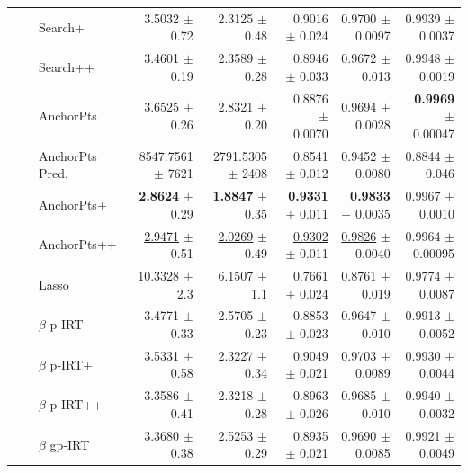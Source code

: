 \begin{longtable}{llp{}rrrrr}
 &  & Search+ & 3.5032 {\scriptsize $\pm$ 0.72} & 2.3125 {\scriptsize $\pm$ 0.48} & 0.9016 {\scriptsize $\pm$ 0.024} & 0.9700 {\scriptsize $\pm$ 0.0097} & 0.9939 {\scriptsize $\pm$ 0.0037} \\
 &  & Search++ & 3.4601 {\scriptsize $\pm$ 0.19} & 2.3589 {\scriptsize $\pm$ 0.28} & 0.8946 {\scriptsize $\pm$ 0.033} & 0.9672 {\scriptsize $\pm$ 0.013} & 0.9948 {\scriptsize $\pm$ 0.0019} \\
 &  & AnchorPts & 3.6525 {\scriptsize $\pm$ 0.26} & 2.8321 {\scriptsize $\pm$ 0.20} & 0.8876 {\scriptsize $\pm$ 0.0070} & 0.9694 {\scriptsize $\pm$ 0.0028} & \textbf{0.9969} {\scriptsize $\pm$ 0.00047} \\
 &  & AnchorPts Pred. & 8547.7561 {\scriptsize $\pm$ 7621} & 2791.5305 {\scriptsize $\pm$ 2408} & 0.8541 {\scriptsize $\pm$ 0.012} & 0.9452 {\scriptsize $\pm$ 0.0080} & 0.8844 {\scriptsize $\pm$ 0.046} \\
 &  & AnchorPts+ & \textbf{2.8624} {\scriptsize $\pm$ 0.29} & \textbf{1.8847} {\scriptsize $\pm$ 0.35} & \textbf{0.9331} {\scriptsize $\pm$ 0.011} & \textbf{0.9833} {\scriptsize $\pm$ 0.0035} & 0.9967 {\scriptsize $\pm$ 0.0010} \\
 &  & AnchorPts++ & \underline{2.9471} {\scriptsize $\pm$ 0.51} & \underline{2.0269} {\scriptsize $\pm$ 0.49} & \underline{0.9302} {\scriptsize $\pm$ 0.011} & \underline{0.9826} {\scriptsize $\pm$ 0.0040} & 0.9964 {\scriptsize $\pm$ 0.00095} \\
 &  & Lasso & 10.3328 {\scriptsize $\pm$ 2.3} & 6.1507 {\scriptsize $\pm$ 1.1} & 0.7661 {\scriptsize $\pm$ 0.024} & 0.8761 {\scriptsize $\pm$ 0.019} & 0.9774 {\scriptsize $\pm$ 0.0087} \\
 &  & $\beta$ p-IRT & 3.4771 {\scriptsize $\pm$ 0.33} & 2.5705 {\scriptsize $\pm$ 0.23} & 0.8853 {\scriptsize $\pm$ 0.023} & 0.9647 {\scriptsize $\pm$ 0.010} & 0.9913 {\scriptsize $\pm$ 0.0052} \\
 &  & $\beta$ p-IRT+ & 3.5331 {\scriptsize $\pm$ 0.58} & 2.3227 {\scriptsize $\pm$ 0.34} & 0.9049 {\scriptsize $\pm$ 0.021} & 0.9703 {\scriptsize $\pm$ 0.0089} & 0.9930 {\scriptsize $\pm$ 0.0044} \\
 &  & $\beta$ p-IRT++ & 3.3586 {\scriptsize $\pm$ 0.41} & 2.3218 {\scriptsize $\pm$ 0.28} & 0.8963 {\scriptsize $\pm$ 0.026} & 0.9685 {\scriptsize $\pm$ 0.010} & 0.9940 {\scriptsize $\pm$ 0.0032} \\
 &  & $\beta$ gp-IRT & 3.3680 {\scriptsize $\pm$ 0.38} & 2.5253 {\scriptsize $\pm$ 0.29} & 0.8935 {\scriptsize $\pm$ 0.021} & 0.9690 {\scriptsize $\pm$ 0.0085} & 0.9921 {\scriptsize $\pm$ 0.0049} \\

\end{longtable}
